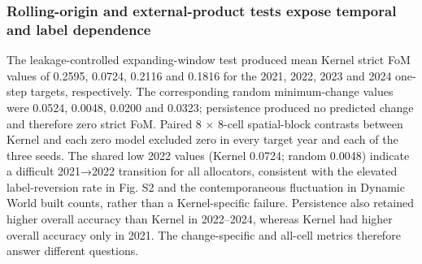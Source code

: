 \documentclass[
]{article}
\begin{document}
\subsubsection{Rolling-origin and external-product tests expose temporal
and label
dependence}\label{rolling-origin-and-external-product-tests-expose-temporal-and-label-dependence}

The leakage-controlled expanding-window test produced mean Kernel strict
FoM values of 0.2595, 0.0724, 0.2116 and 0.1816 for the 2021, 2022, 2023
and 2024 one-step targets, respectively. The corresponding random
minimum-change values were 0.0524, 0.0048, 0.0200 and 0.0323;
persistence produced no predicted change and therefore zero strict FoM.
Paired 8 × 8-cell spatial-block contrasts between Kernel and each zero
model excluded zero in every target year and each of the three seeds.
The shared low 2022 values (Kernel 0.0724; random 0.0048) indicate a
difficult 2021→2022 transition for all allocators, consistent with the
elevated label-reversion rate in Fig. S2 and the contemporaneous
fluctuation in Dynamic World built counts, rather than a Kernel-specific
failure. Persistence also retained higher overall accuracy than Kernel
in 2022--2024, whereas Kernel had higher overall accuracy only in 2021.
The change-specific and all-cell metrics therefore answer different
questions.
\end{document}
